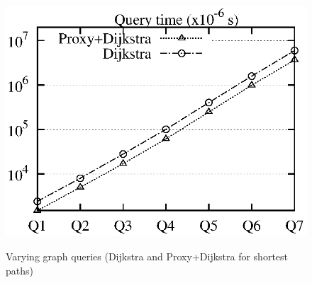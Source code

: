\begin{figure}[t!]
\begin{center}
{\includegraphics[scale=0.422]{./exp/query_cus_path_dj.eps}}
\hspace{-4ex}\vspace{-1.5ex}
\end{center}
\caption{Varying graph queries (Dijkstra and Proxy+Dijkstra for shortest paths)}
\label{fig:performance_path_queries_dj}
\vspace{-1ex}
\end{figure}
